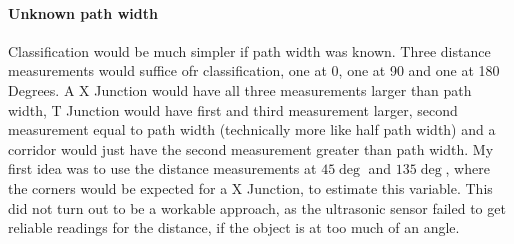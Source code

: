 \paragraph{Unknown path width}
Classification would be much simpler if path width was known. Three distance measurements would suffice ofr classification, one at 0, one at 90 and one at 180 Degrees.
A X Junction would have all three measurements larger than path width,
T Junction would have first and third measurement larger, second measurement equal to path width (technically more like half path width) and
a corridor would just have the second measurement greater than path width.
My first idea was to use the distance measurements at $45\deg$ and $135\deg$, where the corners would be expected for a X Junction, to estimate this variable.
This did not turn out to be a workable approach, as the ultrasonic sensor failed to get reliable readings for the distance, if the object is at too much of an angle.
